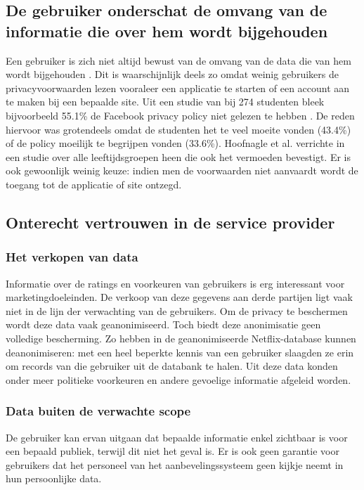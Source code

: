 \subsection{De gebruiker onderschat de omvang van de informatie die over hem wordt bijgehouden}
Een gebruiker is zich niet altijd bewust van de omvang van de data die van hem wordt bijgehouden \cite{pirs}. Dit is waarschijnlijk deels zo omdat weinig gebruikers de privacyvoorwaarden lezen vooraleer een applicatie te starten of een account aan te maken bij een bepaalde site. Uit een studie van \citeauthor{privdisc} bij 274 studenten bleek bijvoorbeeld 55.1\% de Facebook privacy policy niet gelezen te hebben \cite{privdisc}. De reden hiervoor was grotendeels omdat de studenten het te veel moeite vonden (43.4\%) of de policy moeilijk te begrijpen vonden (33.6\%). Hoofnagle et al. verrichte in \cite{hoofnagle} een studie over alle leeftijdsgroepen heen die ook het vermoeden bevestigt. Er is ook gewoonlijk weinig keuze: indien men de voorwaarden niet aanvaardt wordt de toegang tot de applicatie of site ontzegd.
\subsection{Onterecht vertrouwen in de service provider}
\label{onterecht_vertrouwen}

\subsubsection{Het verkopen van data}
Informatie over de ratings en voorkeuren van gebruikers is erg interessant voor marketingdoeleinden. De verkoop van deze gegevens aan derde partijen ligt vaak niet in de lijn der verwachting van de gebruikers. Om de privacy te beschermen wordt deze data vaak geanonimiseerd. Toch biedt deze anonimisatie geen volledige bescherming. Zo hebben \citeauthor{Narayanan2008} in \cite{Narayanan2008} de geanonimiseerde Netflix-database kunnen deanonimiseren: met een heel beperkte kennis van een gebruiker slaagden ze erin om records van die gebruiker uit de databank te halen. Uit deze data konden onder meer politieke voorkeuren en andere gevoelige informatie afgeleid worden.

\subsubsection{Data buiten de verwachte scope \cite{pirs}}
De gebruiker kan ervan uitgaan dat bepaalde informatie enkel zichtbaar is voor een bepaald publiek, terwijl dit niet het geval is. Er is ook geen garantie voor gebruikers dat het personeel van het aanbevelingssysteem geen kijkje neemt in hun persoonlijke data.\\

